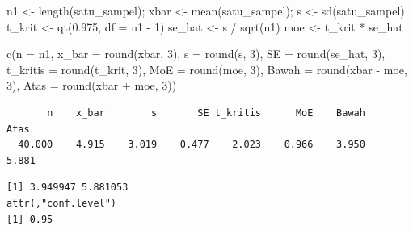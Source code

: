 \documentclass[
  indonesian,
  letterpaper,
]{book}
\newenvironment{Shaded}{\begin{snugshade}}{\end{snugshade}}
\newcommand{\AttributeTok}[1]{\textcolor[rgb]{0.40,0.45,0.13}{#1}}
\newcommand{\CommentTok}[1]{\textcolor[rgb]{0.37,0.37,0.37}{#1}}
\newcommand{\DecValTok}[1]{\textcolor[rgb]{0.68,0.00,0.00}{#1}}
\newcommand{\FloatTok}[1]{\textcolor[rgb]{0.68,0.00,0.00}{#1}}
\newcommand{\FunctionTok}[1]{\textcolor[rgb]{0.28,0.35,0.67}{#1}}
\newcommand{\NormalTok}[1]{\textcolor[rgb]{0.00,0.23,0.31}{#1}}
\newcommand{\OtherTok}[1]{\textcolor[rgb]{0.00,0.23,0.31}{#1}}
\newcommand{\SpecialCharTok}[1]{\textcolor[rgb]{0.37,0.37,0.37}{#1}}
\begin{document}
\begin{Shaded}
\begin{Highlighting}[]
\NormalTok{n1 }\OtherTok{\textless{}{-}} \FunctionTok{length}\NormalTok{(satu\_sampel); xbar }\OtherTok{\textless{}{-}} \FunctionTok{mean}\NormalTok{(satu\_sampel); s }\OtherTok{\textless{}{-}} \FunctionTok{sd}\NormalTok{(satu\_sampel)}
\NormalTok{t\_krit }\OtherTok{\textless{}{-}} \FunctionTok{qt}\NormalTok{(}\FloatTok{0.975}\NormalTok{, }\AttributeTok{df =}\NormalTok{ n1 }\SpecialCharTok{{-}} \DecValTok{1}\NormalTok{)}
\NormalTok{se\_hat }\OtherTok{\textless{}{-}}\NormalTok{ s }\SpecialCharTok{/} \FunctionTok{sqrt}\NormalTok{(n1)}
\NormalTok{moe    }\OtherTok{\textless{}{-}}\NormalTok{ t\_krit }\SpecialCharTok{*}\NormalTok{ se\_hat}

\FunctionTok{c}\NormalTok{(}\AttributeTok{n =}\NormalTok{ n1, }\AttributeTok{x\_bar =} \FunctionTok{round}\NormalTok{(xbar, }\DecValTok{3}\NormalTok{), }\AttributeTok{s =} \FunctionTok{round}\NormalTok{(s, }\DecValTok{3}\NormalTok{), }\AttributeTok{SE =} \FunctionTok{round}\NormalTok{(se\_hat, }\DecValTok{3}\NormalTok{),}
  \AttributeTok{t\_kritis =} \FunctionTok{round}\NormalTok{(t\_krit, }\DecValTok{3}\NormalTok{), }\AttributeTok{MoE =} \FunctionTok{round}\NormalTok{(moe, }\DecValTok{3}\NormalTok{),}
  \AttributeTok{Bawah =} \FunctionTok{round}\NormalTok{(xbar }\SpecialCharTok{{-}}\NormalTok{ moe, }\DecValTok{3}\NormalTok{), }\AttributeTok{Atas =} \FunctionTok{round}\NormalTok{(xbar }\SpecialCharTok{+}\NormalTok{ moe, }\DecValTok{3}\NormalTok{))}
\end{Highlighting}
\end{Shaded}

\begin{verbatim}
       n    x_bar        s       SE t_kritis      MoE    Bawah     Atas 
  40.000    4.915    3.019    0.477    2.023    0.966    3.950    5.881 
\end{verbatim}

\begin{Shaded}
\end{Shaded}

\begin{verbatim}
[1] 3.949947 5.881053
attr(,"conf.level")
[1] 0.95
\end{verbatim}
\end{document}
